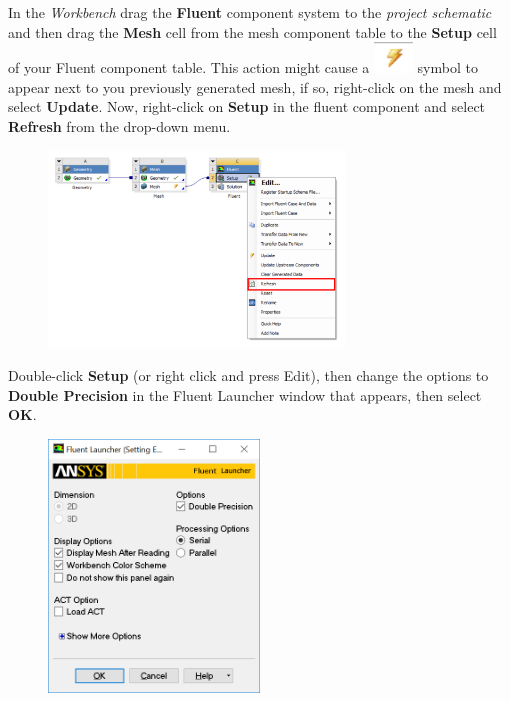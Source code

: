 \documentclass[11pt,a4paper,oneside]{scrartcl}
\newcommand\bfr[1]{\textcolor[rgb]{1,0.00,0.00}{\textbf{\textsf{#1}}}}
\begin{document}
In the \emph{Workbench} drag the \bfr{Fluent} component system to the \emph{project schematic} and then drag the \bfr{Mesh} cell from the mesh component table to the \bfr{Setup} cell of your Fluent component table. This action might cause a \includegraphics[width=.2cm]{lightning_symbol.png} symbol to appear next to you previously generated mesh, if so, right-click on the mesh and select \bfr{Update}. Now, right-click on \bfr{Setup} in the fluent component and select \bfr{Refresh} from the drop-down menu.

\begin{figure}[H]
\begin{center}
\includegraphics[width=0.7\textwidth,clip]{fluent_workbench_refresh.png}
\end{center}
\end{figure}

Double-click \bfr{Setup} (or right click and press Edit), then change the options to \bfr{Double Precision} in the Fluent Launcher window that appears, then select \bfr{OK}.

\begin{figure}[H]
\begin{center}
\includegraphics[width=0.5\textwidth,clip]{fluent_launcher.png}
\end{center}
\end{figure}
\end{document}
